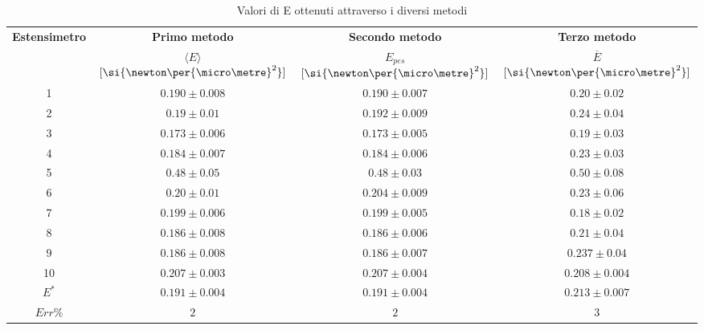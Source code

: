\documentclass[a4paper,11pt,oneside]{article}
\begin{document}
\begin{table}[h!]
\centering
\caption{Valori di E ottenuti attraverso i diversi metodi}
\label{tab:valori_e}
    \begin{tabular}{|c|c|c|c|}
    \hline
    \multirow{2}{*}{\textbf{Estensimetro}} & \textbf{Primo metodo}  & \textbf{Secondo metodo} & \textbf{Terzo metodo}\\
    & $\langle E \rangle$ $[\si{\newton\per{\micro\metre}^2}]$ & $E_{pes}$ $[\si{\newton\per{\micro\metre}^2}]$ & $\overline{E}$ $[\si{\newton\per{\micro\metre}^2}]$\\\hline
    {\cellcolor[rgb]{0.85,0.85,0.85}}1 & {\cellcolor[rgb]{0.85,0.85,0.85}}$0.190 \pm 0.008$ & {\cellcolor[rgb]{0.85,0.85,0.85}}$0.190 \pm 0.007$ & {\cellcolor[rgb]{0.85,0.85,0.85}}$0.20 \pm 0.02$ \\ \hline
    2 & $0.19 \pm 0.01$ & $0.192 \pm 0.009$ & $0.24 \pm 0.04$ \\ \hline
    {\cellcolor[rgb]{0.85,0.85,0.85}}3 & {\cellcolor[rgb]{0.85,0.85,0.85}}$0.173 \pm 0.006$ & {\cellcolor[rgb]{0.85,0.85,0.85}}$0.173 \pm 0.005$ & {\cellcolor[rgb]{0.85,0.85,0.85}}$0.19 \pm 0.03$ \\ \hline
    4 & $0.184 \pm 0.007$ & $0.184 \pm 0.006$ & $0.23 \pm 0.03$ \\ \hline
    {\cellcolor[rgb]{1,0.5,0.5}}5& {\cellcolor[rgb]{1,0.5,0.5}}$0.48 \pm 0.05$ & {\cellcolor[rgb]{1,0.5,0.5}}$0.48 \pm 0.03$ & {\cellcolor[rgb]{1,0.5,0.5}}$0.50 \pm 0.08$ \\ \hline
    6 & $0.20\pm 0.01$ & $0.204 \pm 0.009$ & $0.23 \pm 0.06$ \\ \hline
    {\cellcolor[rgb]{0.85,0.85,0.85}}7 & {\cellcolor[rgb]{0.85,0.85,0.85}}$0.199 \pm 0.006$ & {\cellcolor[rgb]{0.85,0.85,0.85}}$0.199 \pm 0.005$ & {\cellcolor[rgb]{0.85,0.85,0.85}}$0.18 \pm 0.02$ \\ \hline
    8 & $0.186 \pm 0.008$ & $0.186 \pm 0.006$ & $0.21 \pm 0.04$ \\ \hline
    {\cellcolor[rgb]{0.85,0.85,0.85}}9 & {\cellcolor[rgb]{0.85,0.85,0.85}}$0.186 \pm 0.008$ & {\cellcolor[rgb]{0.85,0.85,0.85}}$0.186 \pm 0.007$ & {\cellcolor[rgb]{0.85,0.85,0.85}}$0.237 \pm 0.04$ \\ \hline
    10& $0.207 \pm 0.003$ & $0.207 \pm 0.004 $ & $0.208 \pm 0.004$ \\ \hline \hline
    {\cellcolor[rgb]{0.85,0.85,0.85}}$E^{\ast}$ & {\cellcolor[rgb]{0.85,0.85,0.85}}$0.191\pm0.004$ & {\cellcolor[rgb]{0.85,0.85,0.85}}$0.191\pm0.004$ & {\cellcolor[rgb]{0.85,0.85,0.85}}$0.213\pm0.007$   \\ \hline
    $Err\% $ & $2$ & $2$ & $3$ \\ \hline
\end{tabular}
\end{table}
\end{document}
